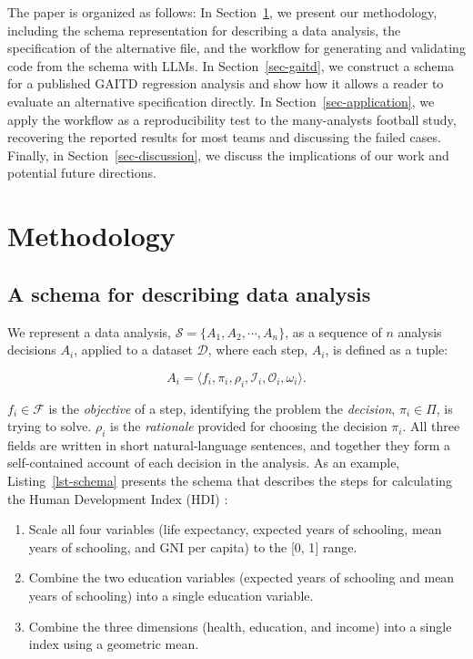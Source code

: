 \documentclass[aoas]{imsart}
\providecommand{\tightlist}{%
  \setlength{\itemsep}{0pt}}
\begin{document}
The paper is organized as follows: In Section~\ref{sec-method}, we
present our methodology, including the schema representation for
describing a data analysis, the specification of the alternative file,
and the workflow for generating and validating code from the schema with
LLMs. In Section~\ref{sec-gaitd}, we construct a schema for a published
GAITD regression analysis and show how it allows a reader to evaluate an
alternative specification directly. In Section~\ref{sec-application}, we
apply the workflow as a reproducibility test to the many-analysts
football study, recovering the reported results for most teams and
discussing the failed cases. Finally, in Section~\ref{sec-discussion},
we discuss the implications of our work and potential future directions.

\section{Methodology}\label{sec-method}

\subsection{A schema for describing data analysis}\label{sec-schema}

We represent a data analysis,
\(\mathcal{S} = \{A_1, A_2, \cdots, A_n\}\), as a sequence of \(n\)
analysis decisions \(A_i\), applied to a dataset \(\mathcal{D}\), where
each step, \(A_i\), is defined as a tuple:

\begin{equation}
A_{i} = \langle f_{i}, \pi_{i}, \rho_{i}, \mathcal{I}_{i}, \mathcal{O}_{i}, \omega_{i} \rangle.
\end{equation}

\(f_{i} \in \mathcal{F}\) is the \emph{objective} of a step, identifying
the problem the \emph{decision}, \(\pi_{i} \in \Pi\), is trying to
solve. \(\rho_{i}\) is the \emph{rationale} provided for choosing the
decision \(\pi_{i}\). All three fields are written in short
natural-language sentences, and together they form a self-contained
account of each decision in the analysis. As an example,
Listing~\ref{lst-schema} presents the schema that describes the steps
for calculating the Human Development Index (HDI) \citep{hdi}:

\begin{enumerate}
\def\labelenumi{\arabic{enumi})}
\tightlist
\item
  Scale all four variables (life expectancy, expected years of
  schooling, mean years of schooling, and GNI per capita) to the {[}0,
  1{]} range.
\item
  Combine the two education variables (expected years of schooling and
  mean years of schooling) into a single education variable.
\item
  Combine the three dimensions (health, education, and income) into a
  single index using a geometric mean.
\end{enumerate}
\end{document}
